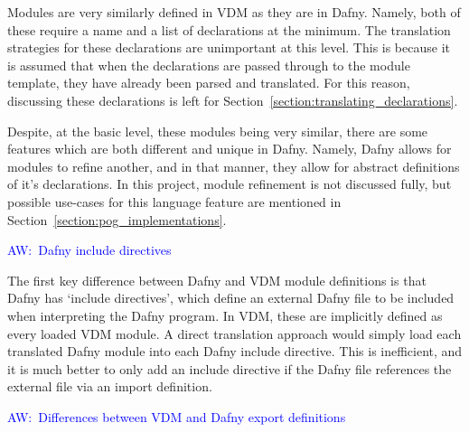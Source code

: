 \documentclass{entcs}
\newcommand{\awcomment}[1]{\ifthenelse { \boolean{showComments} } {\textcolor{blue}{AW:~#1}} { } } %
\begin{document}
Modules are very similarly defined in VDM as they are in Dafny. Namely, both of these require a name and a list of declarations at the minimum. The translation strategies for these declarations are unimportant at this level. This is because it is assumed that when the declarations are passed through to the module template, they have already been parsed and translated. For this reason, discussing these declarations is left for Section~\ref{section:translating_declarations}. 

Despite, at the basic level, these modules being very similar, there are some features which are both different and unique in Dafny. Namely, Dafny allows for modules to refine another, and in that manner, they allow for abstract definitions of it's declarations. In this project, module refinement is not discussed fully, but possible use-cases for this language feature are mentioned in Section~\ref{section:pog_implementations}.

\awcomment{Dafny include directives}

The first key difference between Dafny and VDM module definitions is that Dafny has `include directives', which define an external Dafny file to be included when interpreting the Dafny program. In VDM, these are implicitly defined as every loaded VDM module. A direct translation approach would simply load each translated Dafny module into each Dafny include directive. This is inefficient, and it is much better to only add an include directive if the Dafny file references the external file via an import definition.

\awcomment{Differences between VDM and Dafny export definitions}
\end{document}
